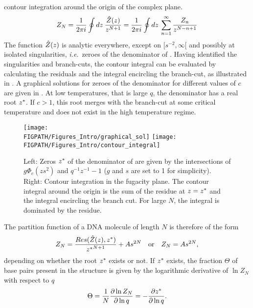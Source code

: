contour integration around the origin of the complex plane.
\begin{equation}
\label{eq:contour_integral}
Z_N = \frac{1}{2\pi i}\oint dz\: \frac{\hat{Z}(z)}{z^{N+1}}=\frac{1}{2\pi i}\oint dz\: \sum_{n=1}^{\infty}\frac{Z_n}{z^{N-n+1}}
\end{equation}
The function $\hat{Z}(z)$ is analytic everywhere, except on $[s^{-2}, \infty[$ and possibly at 
isolated singularities, \emph{i.e.}~zeroes of the denominator of . 
Having identified the singularities and branch-cuts, the contour integral can be evaluated by
calculating the residuals and the integral encircling the branch-cut, as illustrated in .
A graphical solutions for zeroes of the denominator for different values of $c$ are given in .
At low temperatures, that is large $q$, the denominator has a real root ${z^{*}}$.  
If $c>1$, this root merges with the branch-cut at some critical temperature and does not exist in
the high temperature regime.
\begin{figure}
\centering
  \texttt{[image: \\FIGPATH/Figures\_Intro/graphical\_sol]}
  \texttt{[image: \\FIGPATH/Figures\_Intro/contour\_integral]}
\caption[Contour integration in the fugacity plane.]{
\label{fig:contour_integral} 
Left: Zeros ${z^{*}}$ of the denominator of  are given by the
intersections of $g\Phi_c(zs^{2})$ and $q^{-1}z^{-1}-1$ ($g$ and $s$ are set to 1 for simplicity).
Right: Contour integration in the fugacity plane. The contour integral around the origin is the sum 
of the residue at $z={z^{*}}$ and the integral encircling the branch cut. For large $N$, the integral
is dominated by the residue.
}
\end{figure}
The partition function of a DNA molecule of length $N$ is therefore of the form 
\begin{equation}
\label{eq:residues}
Z_N =\frac{Res(\hat{Z}(z), {z^{*}})}{{z^{*}}^{N+1}} + As^{2N} \quad \mathrm{or} \quad Z_N =As^{2N},
\end{equation}
depending on whether the root ${z^{*}}$ exists or not. 
If ${z^{*}}$ exists, the fraction $\Theta$ of base pairs present in the
structure is given by the logarithmic derivative of $\ln Z_N$ with respect to $q$
\begin{equation}
\label{eq:fraction_basepairs}
\Theta=\frac{1}{N}\frac{\partial \ln Z_N}{\partial \ln q}= -\frac{\partial {z^{*}}}{\partial \ln q}.
\end{equation}
